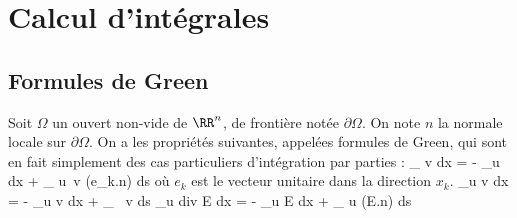 \chapter{Calcul d'int\'egrales}
%
\section{Formules de Green}
\label{sec:green}
\noindent
%
%
Soit $\Omega$ un ouvert non-vide de $\RR^n$, de fronti\`ere not\'ee $\partial\Omega$. On note $n$ la normale locale sur $\partial\Omega$.\saut
%
On a les propri\'et\'es suivantes, appel\'ees formules de Green, qui sont en fait simplement des cas particuliers d'int\'egration par parties :
\be
\int_\Omega {}\; v\; dx = - \int_\Omega u \;  \; dx + \int_{\partial \Omega} u\, v \; (e_k.n)\; ds
\ee
%
o\`u $e_k$ est le vecteur unitaire dans la direction $x_k$.
%
%
\be
\int_\Omega \Delta u \; v\; dx = - \int_\Omega \nabla u \; \nabla v \; dx + \int_{\partial \Omega} \, v \; ds
\ee
%
%
\be
\int_\Omega u \; \hbox{div} E \; dx = - \int_\Omega \nabla u \; E \; dx + \int_{\partial \Omega}  u \; (E.n)\; ds
\ee
%
%
